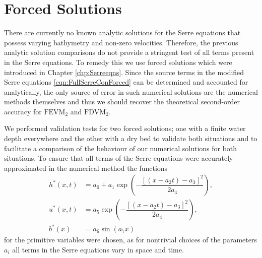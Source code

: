 
\section{Forced Solutions}
There are currently no known analytic solutions for the Serre equations that possess varying bathymetry and non-zero velocities. Therefore, the previous analytic solution comparisons do not provide a stringent test of all terms present in the Serre equations. To remedy this we use forced solutions which were introduced in Chapter \ref{chp:Serreeqns}. Since the source terms in the modified Serre equations \eqref{eqn:FullSerreConForced} can be determined and accounted for analytically, the only source of error in such numerical solutions are the numerical methods themselves and thus we should recover the theoretical second-order accuracy for $\text{FEVM}_2$ and $\text{FDVM}_2$. 

We performed validation tests for two forced solutions; one with a finite water depth everywhere and the other with a dry bed to validate both situations and to facilitate a comparison of the behaviour of our numerical solutions for both situations. To ensure that all terms of the Serre equations were accurately approximated in the numerical method the functions
\begin{subequations}
\begin{align}
\label{eqn:ForcedSolutionxt}
h^*(x,t) &= a_0 + a_1 \exp\left(-\dfrac{\left[\left(x - a_2 t\right) - a_3\right]^2}{2 a_4}\right), \\
u^*(x,t) &= a_5 \exp\left(-\dfrac{\left[\left(x - a_2 t\right) - a_3\right]^2}{2 a_4}\right), \\
b^*(x) &= a_6 \sin\left(a_7 x\right)
\end{align}
\end{subequations}
for the primitive variables were chosen, as for nontrivial choices of the parameters $a_i$ all terms in the Serre equations vary in space and time. 

